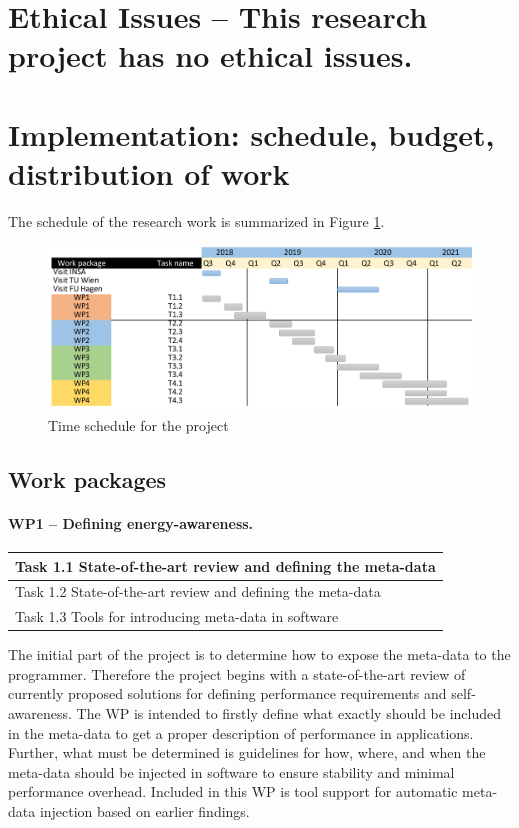 \documentclass{article}
\begin{document}
\section{Ethical Issues \small -- This research project has no ethical issues. }

\section{Implementation: schedule, budget, distribution of work}
The schedule of the research work is summarized in Figure \ref{fig:schedule}.
\begin{figure}[h]
	\centering
	\includegraphics[scale=0.7]{fig/schedule.png}
	\caption{Time schedule for the project}
	\label{fig:schedule}
\end{figure}
\subsection{Work packages}
\paragraph{WP1 -- Defining energy-awareness.}
\begin{table}
\vspace{-0.5cm}
\small
\begin{tabular}{ | l |}
\hline
{Task 1.1 State-of-the-art review and defining the meta-data}  \\ \hline
{Task 1.2 State-of-the-art review and defining the meta-data}  \\ \hline
{Task 1.3 Tools for introducing meta-data in software}		\\ \hline
\end{tabular}
\vspace{-0.3cm}
\end{table}
The initial part of the project is to determine how to expose the meta-data to the programmer.
Therefore the project begins with a state-of-the-art review of currently proposed solutions for defining performance requirements and self-awareness.
The WP is intended to firstly define what exactly should be included in the meta-data to get a proper description of performance in applications. 
Further, what must be determined is guidelines for how, where, and when the meta-data should be injected in software to ensure stability and minimal performance overhead.
Included in this WP is tool support for automatic meta-data injection based on earlier findings.
\end{document}
